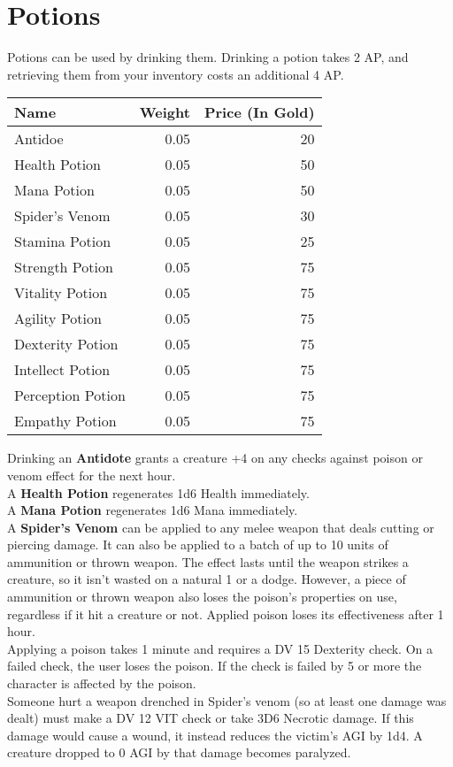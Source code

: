 \section{Potions}
Potions can be used by drinking them. Drinking a potion takes 2 AP, and retrieving them from your inventory costs an additional 4 AP.

\begin{longtable}{l | r | r}
	Name & Weight & Price (In Gold)\\ \hline
	Antidoe & 0.05 & 20\\
	Health Potion & 0.05 & 50\\
	Mana Potion & 0.05 & 50\\
	Spider's Venom & 0.05 & 30\\
	Stamina Potion & 0.05 & 25\\
	Strength Potion & 0.05 & 75\\
	Vitality Potion & 0.05 & 75\\
	Agility Potion & 0.05 & 75\\
	Dexterity Potion & 0.05 & 75\\
	Intellect Potion & 0.05 & 75\\
	Perception Potion & 0.05 & 75\\
	Empathy Potion & 0.05 & 75\\
\end{longtable}


Drinking an \textbf{Antidote} grants a creature +4 on any checks against poison or venom effect for the next hour.\\

A \textbf{Health Potion} regenerates 1d6 Health immediately.\\

A \textbf{Mana Potion} regenerates 1d6 Mana immediately.\\

A \textbf{Spider's Venom} can be applied to any melee weapon that deals cutting or piercing damage. It can also be applied to a batch of up to 10 units of ammunition or thrown weapon. The effect lasts until the weapon strikes a creature, so it isn't wasted on a natural 1 or a dodge. However, a piece of ammunition or thrown weapon also loses the poison's properties on use, regardless if it hit a creature or not. Applied poison loses its effectiveness after 1 hour.\\
Applying a poison takes 1 minute and requires a DV 15 Dexterity check. On a failed check, the user loses the poison. If the check is failed by 5 or more the character is affected by the poison.\\
Someone hurt a weapon drenched in Spider's venom (so at least one damage was dealt) must make a DV 12 VIT check or take 3D6 Necrotic damage. If this damage would cause a wound, it instead reduces the victim's AGI by 1d4. A creature dropped to 0 AGI by that damage becomes paralyzed.\\


